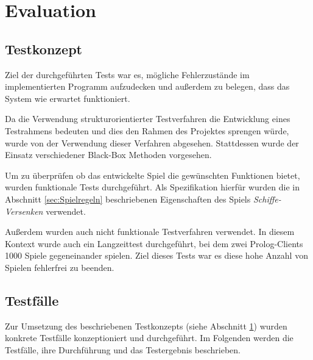 \section{Evaluation} \label{sec:Evaluation}

\subsection{Testkonzept}

	Ziel der durchgeführten Tests war es, mögliche Fehlerzustände im implementierten Programm aufzudecken und außerdem zu belegen, dass das System
	wie erwartet funktioniert. 
	
	Da die Verwendung strukturorientierter Testverfahren die Entwicklung eines Testrahmens bedeuten und dies den Rahmen des Projektes sprengen würde,
	wurde von der Verwendung dieser Verfahren abgesehen.  
	Stattdessen wurde der Einsatz verschiedener Black-Box Methoden vorgesehen.
	
	Um zu überprüfen ob das entwickelte Spiel die gewünschten Funktionen bietet, wurden funktionale Tests durchgeführt. 
	Als Spezifikation hierfür wurden die in Abschnitt \ref{sec:Spielregeln} beschriebenen Eigenschaften des Spiels \textit{Schiffe-Versenken}
	verwendet. 
	
	
	Außerdem wurden auch nicht funktionale Testverfahren verwendet. In diesem Kontext wurde auch ein Langzeittest durchgeführt, bei dem zwei
	Prolog-Clients 1000 Spiele gegeneinander spielen. Ziel dieses Tests war es diese hohe Anzahl von Spielen fehlerfrei zu beenden. 	
	

\subsection{Testfälle}
	Zur Umsetzung des beschriebenen Testkonzepts (siehe Abschnitt \ref{sec:Evaluation}) wurden konkrete Testfälle konzeptioniert und
	durchgeführt. Im Folgenden werden die Testfälle, ihre Durchführung und das Testergebnis beschrieben. 

